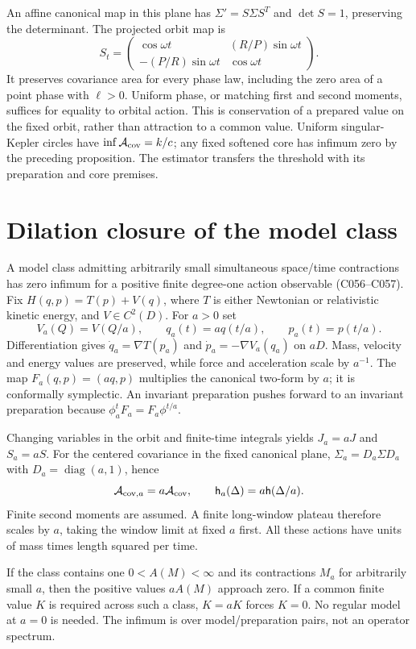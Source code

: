 \documentclass[11pt,a4paper]{article}
\begin{document}
An affine canonical map in this plane has $\Sigma'=S\Sigma S^T$ and
$\det S=1$, preserving the determinant. The projected orbit map is
\[
 S_t=\begin{pmatrix}\cos\omega t&(R/P)\sin\omega t\\
 -(P/R)\sin\omega t&\cos\omega t\end{pmatrix}.
\]
It preserves covariance area for every phase law, including the zero area
of a point phase with $\ell>0$. Uniform phase, or matching first and second
moments, suffices for equality to orbital action. This is conservation of a
prepared value on the fixed orbit, rather than attraction to a common value.
Uniform singular-Kepler circles have $\inf\mathcal A_{\rm cov}=k/c$;
any fixed softened core has infimum zero by the preceding proposition.
The estimator transfers the threshold with its preparation and core premises.

\section{Dilation closure of the model class}
A model class admitting arbitrarily small simultaneous space/time contractions
has zero infimum for a positive finite degree-one action observable
(C056--C057). Fix $H(q,p)=T(p)+V(q)$, where $T$ is either Newtonian or
relativistic kinetic energy, and $V\in C^2(D)$. For $a>0$ set
\[
 V_a(Q)=V(Q/a),\qquad q_a(t)=a q(t/a),\qquad p_a(t)=p(t/a).
\]
Differentiation gives $\dot q_a=\nabla T(p_a)$ and
$\dot p_a=-\nabla V_a(q_a)$ on $aD$. Mass, velocity and energy values
are preserved, while force and acceleration scale by $a^{-1}$.
The map $F_a(q,p)=(aq,p)$ multiplies the canonical two-form by $a$;
it is conformally symplectic. An invariant preparation pushes forward to an
invariant preparation because $\phi_a^tF_a=F_a\phi^{t/a}$.

Changing variables in the orbit and finite-time integrals yields
$J_a=aJ$ and $S_a=aS$. For the centered covariance in the fixed canonical
plane, $\Sigma_a=D_a\Sigma D_a$ with $D_a=\operatorname{diag}(a,1)$, hence
\[
 \mathcal A_{{\rm cov},a}=a\mathcal A_{\rm cov},\qquad
 \mathsf h_a(\Delta)=a\mathsf h(\Delta/a).
\]
Finite second moments are assumed. A finite long-window plateau therefore
scales by $a$, taking the window limit at fixed $a$ first.
All these actions have units of mass times length squared per time.

If the class contains one $0<A(M)<\infty$ and its contractions $M_a$ for
arbitrarily small $a$, then the positive values $aA(M)$ approach zero.
If a common finite value $K$ is required across such a class, $K=aK$
forces $K=0$. No regular model at $a=0$ is needed.
The infimum is over model/preparation pairs, not an operator spectrum.
\end{document}
